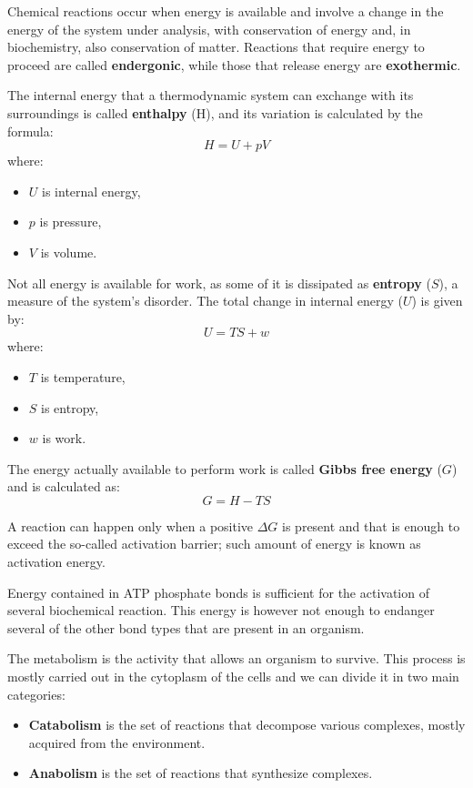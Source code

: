 Chemical reactions occur when energy is available and involve a change in the energy of 
the system under analysis, with conservation of energy and, in biochemistry, also conservation 
of matter. Reactions that require energy to proceed are called \textbf{endergonic}, while those that 
release energy are \textbf{exothermic}.

The internal energy that a thermodynamic system can exchange with its surroundings is called 
\textbf{enthalpy} (H), and its variation is calculated by the formula:
\begin{equation}
    H = U + pV    
\end{equation}
where:
\begin{itemize}
    \item \( U \) is internal energy,
    \item \( p \) is pressure,
    \item \( V \) is volume.
\end{itemize}
Not all energy is available for work, as some of it is dissipated as 
\textbf{entropy} (\( S \)), a measure of the system’s disorder. The 
total change in internal energy (\( U \)) is given by:
\begin{equation}
    U = T S + w    
\end{equation}
where:
\begin{itemize}
    \item \( T \) is temperature,
    \item \( S \) is entropy,
    \item \( w \) is work. 
\end{itemize}

The energy actually available to perform work is called \textbf{Gibbs free energy} (\( G \)) 
and is calculated as:
\begin{equation}
    G = H - T S
\end{equation}

A reaction can happen only when a positive $\Delta G$ is present and that is
enough to exceed the so-called activation barrier; such amount of energy is known
as activation energy.

Energy contained in ATP phosphate bonds is sufficient for the activation of
several biochemical reaction. This energy is however not enough to endanger several
of the other bond types that are present in an organism.

The metabolism is the activity that allows an organism to survive. This process
is mostly carried out in the cytoplasm of the cells and we can divide it in two
main categories:
\begin{itemize}
    \item \textbf{Catabolism} is the set of reactions that decompose various
          complexes, mostly acquired from the environment.
    \item \textbf{Anabolism} is the set of reactions that synthesize complexes.
\end{itemize}

